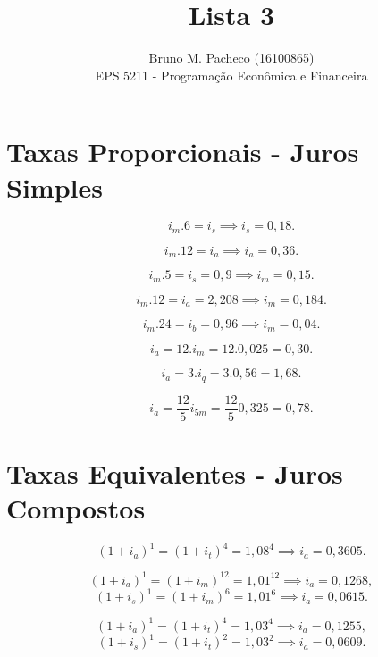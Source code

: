\documentclass[a4paper]{report}
\begin{document}
 
\title{Lista 3}
\author{Bruno M. Pacheco (16100865)\\
EPS 5211 - Programação Econômica e Financeira}
 
\maketitle
 
\section*{Taxas Proporcionais - Juros Simples}


\[
i_m . 6 = i_s \implies i_s = 0,18
.\] 

\[
i_m . 12 = i_a \implies i_a = 0,36
.\] 



\[
i_m . 5 = i_s = 0,9 \implies i_m = 0,15
.\]

\[
i_m . 12 = i_a = 2,208 \implies i_m = 0,184
.\] 


\[
i_m . 24 = i_b = 0,96 \implies i_m = 0,04
.\] 



\[
i_a = 12 . i_m = 12 . 0,025 = 0,30
.\] 


\[
i_a = 3 . i_q = 3 . 0,56 = 1,68
.\] 

\[
i_a = \frac{12}{5} i_{5m} =\frac{12}{5} 0,325 = 0,78
.\] 

\section*{Taxas Equivalentes - Juros Compostos}


\[
\left( 1+i_a \right) ^{1} = \left( 1+i_t \right) ^{4} = 1,08^{4} \implies i_a = 0,3605
.\] 


\[
\left( 1+i_a \right) ^{1} = \left( 1+i_m \right) ^{12} =  1,01 ^{12} \implies i_a = 0,1268
,\] \[
\left( 1+i_s \right) ^{1} = \left( 1+i_m \right) ^{6} =  1,01 ^{6} \implies i_a = 0,0615
.\] 


\[
\left( 1+i_a \right) ^{1} = \left( 1+i_t \right) ^{4} =  1,03 ^{4} \implies i_a = 0,1255
,\] \[
\left( 1+i_s \right) ^{1} = \left( 1+i_t \right) ^{2} =  1,03 ^{2} \implies i_a = 0,0609
.\] 
\end{document}
